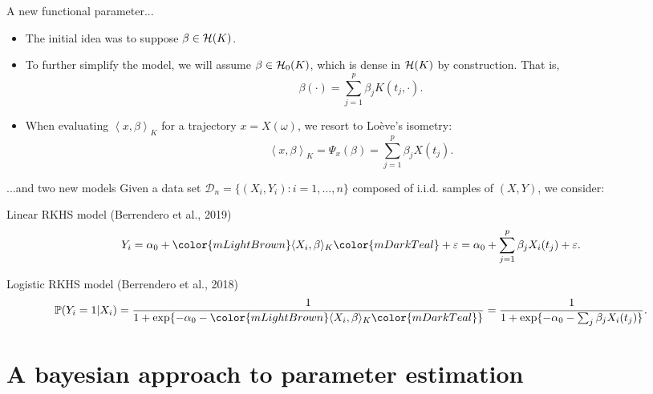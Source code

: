 \documentclass[10pt, english, professionalfonts]{beamer}
\newcommand\maroon[1]{\color{mLightBrown}#1\color{mDarkTeal}}
\newcommand{\Hcal}{\ensuremath\mathcal{H}}
\newcommand\dotprod[2]{\left\langle #1, #2 \right\rangle}
\begin{document}
\begin{frame}{A new functional parameter...}
  \begin{itemize}
    \item The initial idea was to suppose \(\beta \in \Hcal(K)\).
    \item To further simplify the model, we will assume \(\beta \in \Hcal_0(K)\), which is dense in \(\Hcal(K)\) by construction. That is,
    \[
      \beta(\cdot) = \sum_{j=1}^p \beta_j K(t_j, \cdot).
    \]
    \item When evaluating \(\dotprod{x}{\beta}_K\) for a trajectory \(x=X(\omega)\), we resort to Loève's isometry:
    \[
      \dotprod{x}{\beta}_K = \Psi_x(\beta) = \sum_{j=1}^p \beta_j X(t_j).
    \]
  \end{itemize}

\end{frame}


\begin{frame}{...and two new models}
  Given a data set \(\mathcal D_n = \{(X_i, Y_i): i=1,\dots, n\}\) composed of i.i.d. samples of \((X, Y)\), we consider:

  \vspace{1em}

  \begin{block}{Linear RKHS model (Berrendero et al., 2019)}
  \[
    Y_i = \alpha_0 + \maroon{\langle X_i, \beta \rangle_K} + \varepsilon = \alpha_0 + \sum_{j=1}^p \beta_j X_i(t_j) + \varepsilon.
  \]
\end{block}
\vspace{1em}
\begin{block}{Logistic RKHS model (Berrendero et al., 2018)}
    \[
    \mathbb P (Y_i=1| X_i) = \frac{1}{1 + \exp\{-\alpha_0 - \maroon{\langle X_i, \beta\rangle_K}\}} = \frac{1}{1 + \exp\{-\alpha_0 - \sum_j \beta_j X_i(t_j)\}}.
  \]
\end{block}

\end{frame}

\section{A bayesian approach to parameter estimation}
\end{document}
